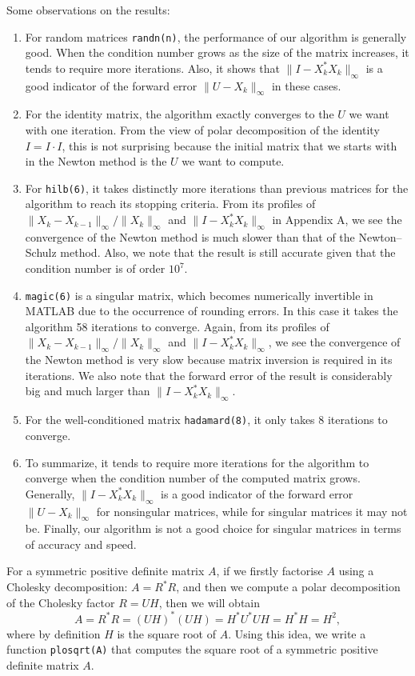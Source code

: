 \documentclass[12pt]{article}
\def\norm#1{\|#1\|}
\def\t#1{\texttt{\upshape #1}}
\begin{document}
Some observations on the results:
\begin{enumerate}
\item For random matrices \t{randn(n)}, the performance of our algorithm is generally good. When the condition number grows as the size of the matrix increases, it tends to require more iterations. Also, it shows that $\norm{I-X_k^*{X_k}}_\infty$ is a good indicator of the forward error $\norm{U-X_k}_\infty$ in these cases.
\item For the identity matrix, the algorithm exactly converges to the $U$ we want with one iteration. From the view of polar decomposition of the identity $I=I\cdot I$, this is not surprising because the initial matrix that we starts with in the Newton method is the $U$ we want to compute.
\item For \t{hilb(6)}, it takes distinctly more iterations than previous matrices for the algorithm to reach its stopping criteria. From its profiles of $\norm{X_k-X_{k-1}}_\infty/\norm{X_k}_\infty$ and $\norm{I-X_k^*{X_k}}_\infty$ in Appendix A, we see the convergence of the Newton method is much slower than that of the Newton--Schulz method. Also, we note that the result is still accurate given that the condition number is of order $10^7$.
\item \t{magic(6)} is a singular matrix, which becomes numerically invertible in MATLAB due to the occurrence of rounding errors. In this case it takes the algorithm 58 iterations to converge. Again, from its profiles of $\norm{X_k-X_{k-1}}_\infty/\norm{X_k}_\infty$ and $\norm{I-X_k^*{X_k}}_\infty$, we see the convergence of the Newton method is very slow because matrix inversion is required in its iterations. We also note that the forward error of the result is considerably big and much larger than $\norm{I-X_k^*{X_k}}_\infty$.
\item For the well-conditioned matrix \t{hadamard(8)}, it only takes 8  iterations to converge.
\item To summarize, it tends to require more iterations for the algorithm to converge 
when the condition number of the computed matrix grows. Generally, 
$\norm{I-X_k^*{X_k}}_\infty$ is a good indicator of the forward error 
$\norm{U-X_k}_\infty$ for nonsingular matrices, while for singular matrices it may not 
be. Finally, our algorithm is not a good choice for singular matrices in terms of 
accuracy and speed.
\end{enumerate}
 \vspace{.2cm}
 
 
 For a symmetric positive definite matrix $A$, if we firstly factorise $A$ using a Cholesky decomposition: $A=R^*R$, and then we compute a polar decomposition of the Cholesky factor $R=UH$, then we will obtain
$$
A=R^*R=(UH)^*(UH)=H^*U^*UH=H^*H=H^2,
$$
where by definition $H$ is the square root of $A$. Using this idea, we write a function \t{plosqrt(A)} that computes the square root of a symmetric positive definite matrix $A$.
\end{document}
